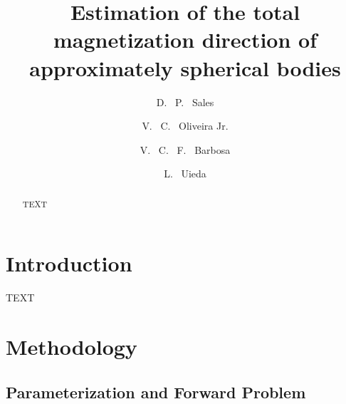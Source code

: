 \documentclass[journal abbreviation, npg]{copernicus}
\begin{document}
\linenumbers

\title{Estimation of the total magnetization direction of approximately spherical bodies}

\author[1]{D. ~P. ~Sales}
\author[1]{V. ~C. ~Oliveira Jr.}
\author[1]{V. ~C. ~F. ~Barbosa}
\author[1, 2]{L. ~Uieda}






\received{}
\pubdiscuss{} %
\revised{}
\accepted{}
\published{}



\maketitle  %

\begin{abstract}
TEXT
\end{abstract}

\section{Introduction}
TEXT

\section{Methodology}

\subsection{Parameterization and Forward Problem}
\end{document}
